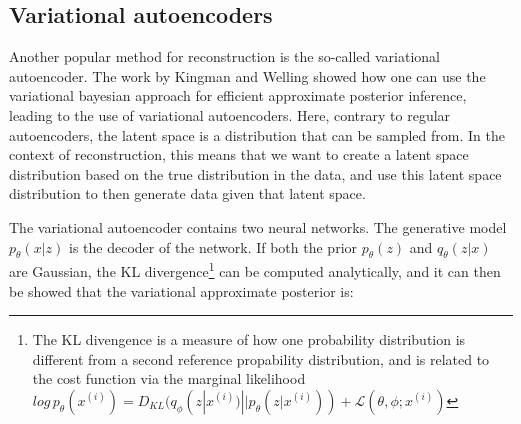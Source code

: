 \subsection{Variational autoencoders}
Another popular method for reconstruction is the so-called variational autoencoder. The work by Kingman and Welling \cite{VAE} showed how
one can use the variational bayesian approach for efficient approximate posterior inference, leading to the use of variational autoencoders.
Here, contrary to regular autoencoders, the latent space is a distribution that can be sampled from. In the context of reconstruction, this means that
we want to create a latent space distribution based on the true distribution in the data, and use this latent space distribution to then generate
data given that latent space. \par
The variational autoencoder contains two neural networks. The generative model $p_{\theta}(x|z)$ is the decoder of the network.
If both the prior $p_{\theta}(z)$ and $q_{\theta}(z|x)$ are Gaussian, the KL divergence\footnote{The KL divengence is a measure of how one probability distribution is different from a second reference propability distribution, and is related to the cost function via the marginal likelihood $log\, p_{\theta}(x^{(i)}) = D_{KL}(q_{\phi}(z|x^{(i)})||p_{\theta}(z|x^{(i)})) + \mathcal{L}(\theta, \phi;x^{(i)})$} can be computed analytically, and it 
can then be showed\cite{VAE} that the variational approximate posterior is:

